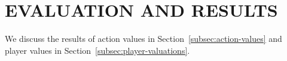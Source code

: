 \documentclass[]{article}
\begin{document}






\section{EVALUATION AND RESULTS}

We discuss the results of action values in Section~\ref{subsec:action-values} and player values in Section~\ref{subsec:player-valuations}. %

\end{document}
